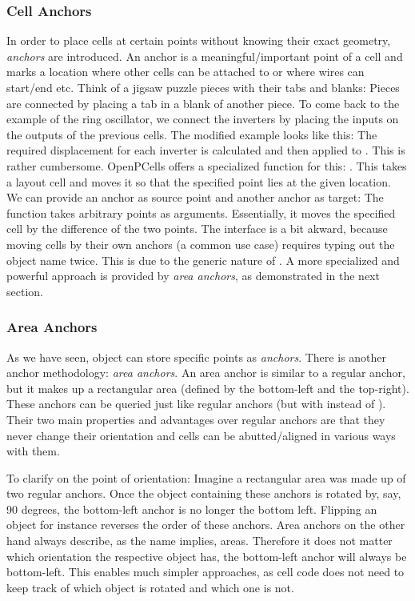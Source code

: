 \subsubsection{Cell Anchors}
In order to place cells at certain points without knowing their exact geometry, \emph{anchors} are introduced.
An anchor is a meaningful/important point of a cell and marks a location where other cells can be attached to or where wires can start/end etc.
Think of a jigsaw puzzle pieces with their tabs and blanks: Pieces are connected by placing a tab in a blank of another piece.
To come back to the example of the ring oscillator, we connect the inverters by placing the inputs on the outputs of the previous cells.
The modified example looks like this:
The required displacement for each inverter is calculated and then applied to .
This is rather cumbersome.
OpenPCells offers a specialized function for this: .
This takes a layout cell and moves it so that the specified point lies at the given location.
We can provide an anchor as source point and another anchor as target:
The function  takes arbitrary points as arguments.
Essentially, it moves the specified cell by the difference of the two points.
The interface is a bit akward, because moving cells by their own anchors (a common use case) requires typing out the object name twice.
This is due to the generic nature of .
A more specialized and powerful approach is provided by \emph{area anchors}, as demonstrated in the next section.

\subsubsection{Area Anchors}
As we have seen, object can store specific points as \emph{anchors}.
There is another anchor methodology: \emph{area anchors}.
An area anchor is similar to a regular anchor, but it makes up a rectangular area (defined by the bottom-left and the top-right).
These anchors can be queried just like regular anchors (but with  instead of ).
Their two main properties and advantages over regular anchors are that they never change their orientation and cells can be abutted/aligned in various ways with them.

To clarify on the point of orientation:
Imagine a rectangular area was made up of two regular anchors.
Once the object containing these anchors is rotated by, say, 90 degrees, the bottom-left anchor is no longer the bottom left.
Flipping an object for instance reverses the order of these anchors.
Area anchors on the other hand always describe, as the name implies, areas.
Therefore it does not matter which orientation the respective object has, the bottom-left anchor will always be bottom-left.
This enables much simpler approaches, as cell code does not need to keep track of which object is rotated and which one is not.

